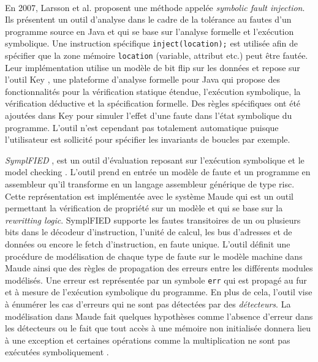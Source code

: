             \paragraph{} 
            En 2007, Larsson et al. \cite{Larsson/VERIFY07} proposent une méthode appelée \textit{symbolic fault injection}. Ils présentent un outil d'analyse dans le cadre de la tolérance au fautes d'un programme source en Java et qui se base sur l'analyse formelle et l'exécution symbolique.
            Une instruction spécifique \texttt{inject(location);} est utilisée afin de spécifier que la zone mémoire \texttt{location} (variable, attribut etc.) peut être fautée. Leur implémentation utilise un modèle de bit flip sur les données et repose sur l'outil Key \cite{Ahrendt/Springer05}, une plateforme d'analyse formelle pour Java qui propose des fonctionnalités pour la vérification statique étendue, l'exécution symbolique, la vérification déductive et la spécification formelle.
            Des règles spécifiques ont été ajoutées dans Key pour simuler l'effet d'une faute dans l'état symbolique du programme.
            L'outil n'est cependant pas totalement automatique puisque l'utilisateur est sollicité pour spécifier les invariants de boucles par exemple.
            
            \textit{SymplFIED} \cite{Pattabiraman/DSN08}, est un outil d'évaluation reposant sur l'exécution symbolique et le model checking \cite{Pattabiraman/TC12}.
            L'outil prend en entrée un modèle de faute et un programme en assembleur qu'il transforme en un langage assembleur générique de type \gls{risc}.
            Cette représentation est implémentée avec le système Maude \cite{Clavel/ENTCS96, clavel2002maude} qui est un outil permettant la vérification de propriété sur un modèle et qui se base sur la \textit{rewritting logic}.
            SymplFIED supporte les fautes transitoires de un ou plusieurs bits dans le décodeur d'instruction, l'unité de calcul, les bus d'adresses et de données ou encore le fetch d'instruction, en faute unique.
            L'outil définit une procédure de modélisation de chaque type de faute sur le modèle machine dans Maude ainsi que des règles de propagation des erreurs entre les différents modules modélisés. Une erreur est représentée par un symbole \texttt{err} qui est propagé au fur et à mesure de l'exécution symbolique du programme.
            En plus de cela, l'outil vise à énumérer les cas d'erreurs qui ne sont pas détectées par des \textit{détecteurs}.
            La modélisation dans Maude fait quelques hypothèses comme l'absence d'erreur dans les détecteurs ou le fait que tout accès à une mémoire non initialisée donnera lieu à une exception et certaines opérations comme la multiplication ne sont pas exécutées symboliquement \cite{Pattabiraman/TC12}. 
            
